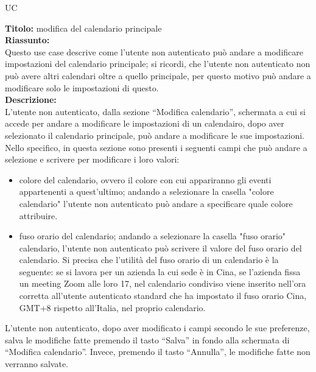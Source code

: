 \begin{listaPersonale}{UC}
    \begin{listaPersonale2}[UC] {}
            \textbf{Titolo: } modifica del calendario principale \\
            \textbf{Riassunto:} \\
            Questo use case descrive come l'utente non autenticato può andare a modificare impostazioni del calendario principale; si ricordi, che l'utente non autenticato non può avere altri calendari oltre a quello principale, per questo motivo può andare a modificare solo le impostazioni di questo. \\
            \textbf{Descrizione:} \\
            L'utente non autenticato, dalla sezione  “Modifica calendario”, schermata a cui si accede per andare a modificare le impostazioni di un calendairo, dopo aver selezionato il calendario principale, può andare a modificare le sue impostazioni. Nello specifico, in questa sezione sono presenti i seguenti campi che può andare a selezione e scrivere per modificare i loro valori:
            \begin{itemize}
                \item colore del calendario, ovvero il colore con cui appariranno gli eventi appartenenti a quest'ultimo; andando a selezionare la casella "colore calendario" l'utente non autenticato può andare a specificare quale colore attribuire.
                \item fuso orario del calendario; andando a selezionare la casella "fuso orario" calendario, l'utente non autenticato può scrivere il valore del fuso orario del calendario. Si precisa che l'utilità del fuso orario di un calendario è la seguente:  se si lavora per un azienda la cui sede è in Cina, se l'azienda fissa un meeting Zoom alle loro 17, nel calendario condiviso viene inserito nell'ora corretta all'utente autenticato standard che ha impostato il fuso orario Cina, GMT+8 rispetto all'Italia, nel proprio calendario.
            \end{itemize}
            L'utente non autenticato, dopo aver modificato i campi secondo le sue preferenze, salva le modifiche fatte premendo il tasto “Salva” in fondo alla schermata di “Modifica calendario”. Invece, premendo il tasto “Annulla”, le modifiche fatte non verranno salvate.


\end{listaPersonale2}
\end{listaPersonale}
